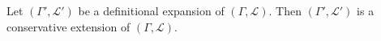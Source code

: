 Let $(\Gamma', \mathcal{L}')$ be a definitional expansion of $(\Gamma, \mathcal{L})$. Then $(\Gamma', \mathcal{L}')$ is a conservative extension of $(\Gamma, \mathcal{L})$.
